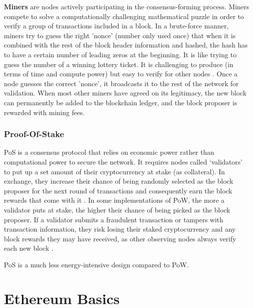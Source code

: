 \textbf{Miners} are nodes actively participating in the consensus-forming process. Miners compete 
to solve a computationally challenging mathematical puzzle in order to verify a group of transactions included in a block. In a brute-force manner, miners try to guess the right 'nonce' (number only used once) that when it is combined with the rest of the block header information and hashed, the hash has to have a certain number of leading zeros at the beginning. It is like trying to guess the number of a winning lottery ticket. It is challenging to produce (in terms of time and compute power) but easy to verify for other nodes \cite{Centieiro2021BitcoinCoding}. Once a node guesses the correct 'nonce', it broadcasts it to the rest of the network for validation. When most other miners have agreed on its legitimacy, the new block can permanently be added to the blockchain ledger, and the block proposer is rewarded with mining fees.


\subsubsection{Proof-Of-Stake}

PoS is a consensus protocol that relies on economic power rather than computational power to secure the network. It requires nodes called ‘validators’ to put up a set amount of their cryptocurrency at stake (as collateral). In exchange, they increase their chance of being randomly selected as the block proposer for the next round of transactions and consequently earn the block rewards that come with it \cite{King2012PPCoin:Proof-of-Stake}. In some implementations of PoW, the more a validator puts at stake, the higher their chance of being picked as the block proposer. If a validator submits a fraudulent transaction or tampers with transaction information, they risk losing their staked cryptocurrency and any block rewards they may have received, as other observing nodes always verify each new block \cite{Napoletano2022WhatAdvisor}. 

PoS is a much less energy-intensive design compared to PoW.



\section{Ethereum Basics}

